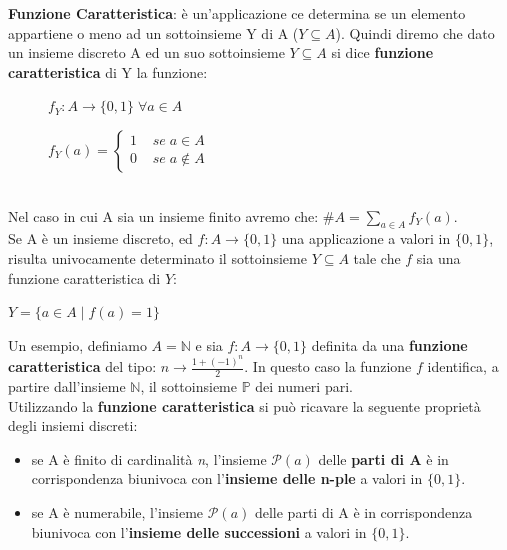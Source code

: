 \bigskip

\textbf{Funzione Caratteristica}: è un'applicazione ce determina se un elemento appartiene o meno ad un sottoinsieme Y di A ($Y \subseteq A$). Quindi diremo che dato un insieme discreto A ed un suo sottoinsieme $Y \subseteq A$ si dice \textbf{funzione caratteristica} di Y la funzione:
\begin{figure}[h]
    \begin{minipage}{0.5\textwidth}
        \centering
        $f_Y : A \rightarrow \{0, 1\} \; \forall a \in A$
    \end{minipage}
    \begin{minipage}{0.5\textwidth}
        \centering
        \begin{math}
            f_Y(a) = 
            \begin{cases}
                1 \;\;\;\; se \; a \in A \\
                0 \;\;\;\; se \; a \notin A
            \end{cases}
        \end{math}
    \end{minipage}
\end{figure} \\
Nel caso in cui A sia un insieme finito avremo che: $\#A = \sum_{a \in A}{f_Y(a)}$. \\
Se A è un insieme discreto, ed $f : A \rightarrow \{0, 1\}$ una applicazione a valori in $\{0, 1\}$, risulta univocamente determinato il sottoinsieme $Y \subseteq A$ tale che $f$ sia una funzione caratteristica di $Y$:
\begin{center}
    $Y = \{a \in A \; | \; f(a) = 1\}$
\end{center}
Un esempio, definiamo $A = \mathbb{N}$ e sia $f : A \rightarrow \{0, 1\}$ definita da una \textbf{funzione caratteristica} del tipo: $n \rightarrow \frac{1 + (-1)^{n}}{2}$. In questo caso la funzione $f$ identifica, a partire dall'insieme $\mathbb{N}$, il sottoinsieme $\mathbb{P}$ dei numeri pari. \\
Utilizzando la \textbf{funzione caratteristica} si può ricavare la seguente proprietà degli insiemi discreti:
\begin{itemize}[nosep]
    \item se A è finito di cardinalità \textit{n}, l'insieme $\mathcal{P}(a)$ delle \textbf{parti di A} è in corrispondenza biunivoca con l'\textbf{insieme delle n-ple} a valori in $\{0, 1\}$.
    \item se A è numerabile, l'insieme $\mathcal{P}(a)$ delle parti di A è in corrispondenza biunivoca con l'\textbf{insieme delle successioni} a valori in $\{0, 1\}$.
\end{itemize}

